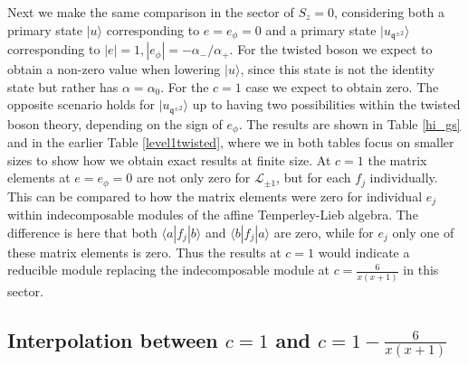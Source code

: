 \documentclass[a4paper,10pt]{article}
\newcommand{\q}{\mathfrak{q}}
\newcommand{\aSt}{\mathcal{W}}
\newcommand{\AStTL}[2]{\aSt_{#1,#2}}
\newcommand{\KSgen}{\mathcal{L}}
\begin{document}
Next we make the same comparison in the sector of $S_z=0$, considering both a primary state $|u\rangle$ corresponding to $e=e_\phi=0$ and a primary state $|u_{\q^{\pm2}}\rangle$ corresponding to $|e|=1, |e_\phi|=-\alpha_-/\alpha_+$. For the twisted boson we expect to obtain a non-zero value when lowering $|u\rangle$, since this state is not the identity state but rather has $\alpha=\alpha_0$. For the $c=1$ case we expect to obtain zero. The opposite scenario holds for $|u_{\q^{\pm2}}\rangle$ up to having two possibilities within the twisted boson theory, depending on the sign of $e_\phi$. The results are shown in Table \ref{hi_gs} and in the earlier Table \ref{level1twisted}, where we in both tables focus on smaller sizes to show how we obtain exact results at finite size.
At $c=1$ the matrix elements at $e=e_\phi=0$ are not only zero for $\KSgen_{\pm1}$, but for each $f_j$ individually. This can be compared to how the matrix elements were zero for individual $e_j$ within indecomposable modules of the affine Temperley-Lieb algebra. The difference is here that both $\langle a| f_j|b\rangle$ and $\langle b| f_j|a\rangle$ are zero, while for $e_j$ only one of these matrix elements is zero. Thus the results at $c=1$ would indicate a reducible module replacing the indecomposable module at $c=\frac{6}{x(x+1)}$ in this sector. 





\subsection{Interpolation between $c=1$ and $c=1-\frac{6}{x(x+1)}$}\label{interpolation}
\end{document}
